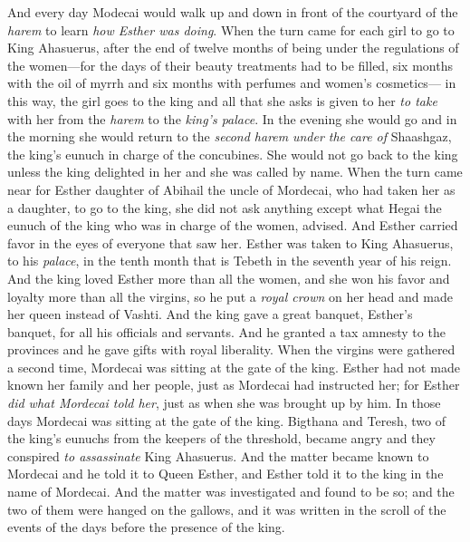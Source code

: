 \begin{biblechapter}
\verse And every day Modecai would walk up and down in front of the courtyard of the \textit{harem} to learn \textit{how Esther was doing}.
\verse When the turn came for each girl to go to King Ahasuerus, after the end of twelve months of being under the regulations of the women—for the days of their beauty treatments had to be filled, six months with the oil of myrrh and six months with perfumes and women’s cosmetics—
\verse in this way, the girl goes to the king and all that she asks is given to her \textit{to take} with her from the \textit{harem} to the \textit{king’s palace}.
\verse In the evening she would go and in the morning she would return to the \textit{second harem} \textit{under the care of} Shaashgaz, the king’s eunuch in charge of the concubines. She would not go back to the king unless the king delighted in her and she was called by name.
\verse When the turn came near for Esther daughter of Abihail the uncle of Mordecai, who had taken her as a daughter, to go to the king, she did not ask anything except what Hegai the eunuch of the king who was in charge of the women, advised. And Esther carried favor in the eyes of everyone that saw her.
\verse Esther was taken to King Ahasuerus, to his \textit{palace}, in the tenth month that is Tebeth in the seventh year of his reign.
\verse And the king loved Esther more than all the women, and she won his favor and loyalty more than all the virgins, so he put a \textit{royal crown} on her head and made her queen instead of Vashti.
\verse And the king gave a great banquet, Esther’s banquet, for all his officials and servants. And he granted a tax amnesty to the provinces and he gave gifts with royal liberality.
 When the virgins were gathered a second time, Mordecai was sitting at the gate of the king.
\verse Esther had not made known her family and her people, just as Mordecai had instructed her; for Esther \textit{did what Mordecai told her}, just as when she was brought up by him.
\verse In those days Mordecai was sitting at the gate of the king. Bigthana and Teresh, two of the king’s eunuchs from the keepers of the threshold, became angry and they conspired \textit{to assassinate} King Ahasuerus.
\verse And the matter became known to Mordecai and he told it to Queen Esther, and Esther told it to the king in the name of Mordecai.
\verse And the matter was investigated and found to be so; and the two of them were hanged on the gallows, and it was written in the scroll of the events of the days before the presence of the king.
\end{biblechapter}

